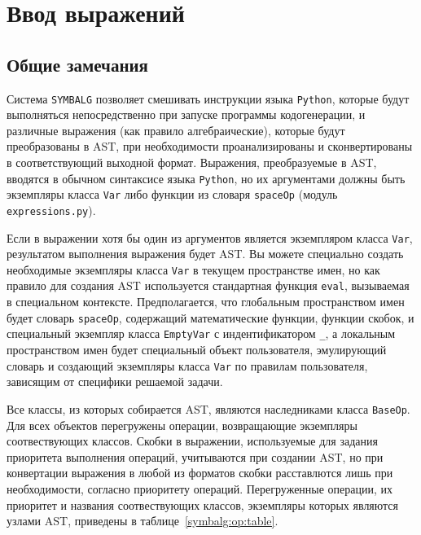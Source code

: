 \section{Ввод выражений}
\label{sec:AST}
\subsection{Общие замечания}
Система {\tt SYMBALG} позволяет смешивать инструкции языка \verb'Python', которые будут выполняться непосредственно при запуске программы кодогенерации,
и различные выражения (как правило алгебраические), которые будут преобразованы в AST, при необходимости проанализированы и сконвертированы в соответствующий
выходной формат. Выражения, преобразуемые в AST, вводятся в обычном синтаксисе языка \verb'Python', но их аргументами должны быть 
экземпляры класса \verb'Var' либо функции из словаря \verb'spaceOp' (модуль \verb'expressions.py'). 

Если в выражении хотя бы один из аргументов является экземпляром класса \verb'Var', результатом выполнения выражения будет AST.
Вы можете специально создать необходимые экземпляры класса \verb'Var' в текущем пространстве имен, но как правило для создания AST
используется стандартная функция \verb'eval', вызываемая в специальном контексте. Предполагается, что глобальным пространством имен будет словарь
\verb'spaceOp', содержащий математические функции, функции скобок, и специальный экземпляр класса \verb'EmptyVar' с индентификатором \verb'_',
а локальным пространством имен будет специальный объект пользователя, эмулирующий словарь и создающий экземпляры класса \verb'Var' по правилам пользователя,
зависящим от специфики решаемой задачи.

Все классы, из которых собирается AST, являются наследниками класса \verb'BaseOp'. Для всех объектов перегружены операции,
возвращающие экземпляры соотвествующих классов. Скобки в выражении, используемые для задания приоритета выполнения операций, учитываются при создании AST,
но при конвертации выражения в любой из форматов скобки расставлются лишь при необходимости, согласно приоритету операций.
Перегруженные операции, их приоритет и названия соотвествующих классов, экземпляры которых являются узлами AST, приведены в таблице~\ref{symbalg:op:table}. 

